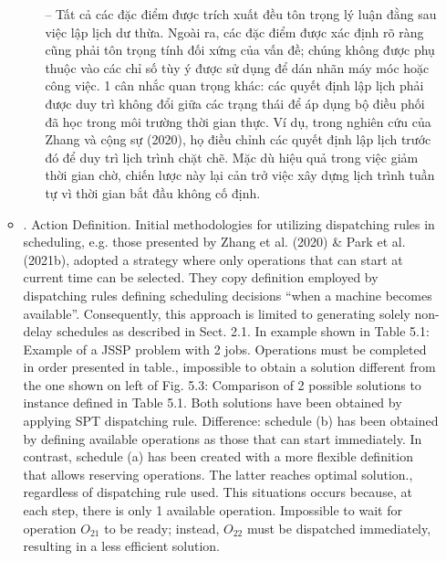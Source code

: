 \documentclass{article}
\begin{document}
\begin{itemize}
\begin{itemize}
\begin{itemize}
            -- Tất cả các đặc điểm được trích xuất đều tôn trọng lý luận đằng sau việc lập lịch dư thừa. Ngoài ra, các đặc điểm được xác định rõ ràng cũng phải tôn trọng tính đối xứng của vấn đề; chúng không được phụ thuộc vào các chỉ số tùy ý được sử dụng để dán nhãn máy móc hoặc công việc. 1 cân nhắc quan trọng khác: các quyết định lập lịch phải được duy trì không đổi giữa các trạng thái để áp dụng bộ điều phối đã học trong môi trường thời gian thực. Ví dụ, trong nghiên cứu của Zhang và cộng sự (2020), họ điều chỉnh các quyết định lập lịch trước đó để duy trì lịch trình chặt chẽ. Mặc dù hiệu quả trong việc giảm thời gian chờ, chiến lược này lại cản trở việc xây dựng lịch trình tuần tự vì thời gian bắt đầu không cố định.
        \end{itemize}
        \item {. Action Definition.} Initial methodologies for utilizing dispatching rules in scheduling, e.g. those presented by Zhang et al. (2020) \& Park et al. (2021b), adopted a strategy where only operations that can start at current time can be selected. They copy definition employed by dispatching rules defining scheduling decisions ``when a machine becomes available''. Consequently, this approach is limited to generating solely non-delay schedules as described in Sect. 2.1. In example shown in {\sf Table 5.1: Example of a JSSP problem with 2 jobs. Operations must be completed in order presented in table.}, impossible to obtain a solution different from the one shown on left of {\sf Fig. 5.3: Comparison of 2 possible solutions to instance defined in Table 5.1. Both solutions have been obtained by applying SPT dispatching rule. Difference: schedule (b) has been obtained by defining available operations as those that can start immediately. In contrast, schedule (a) has been created with a more flexible definition that allows reserving operations. The latter reaches optimal solution.}, regardless of dispatching rule used. This situations occurs because, at each step, there is only 1 available operation. Impossible to wait for operation $O_{21}$ to be ready; instead, $O_{22}$ must be dispatched immediately, resulting in a less efficient solution.


\end{itemize}
\end{itemize}
\end{document}
